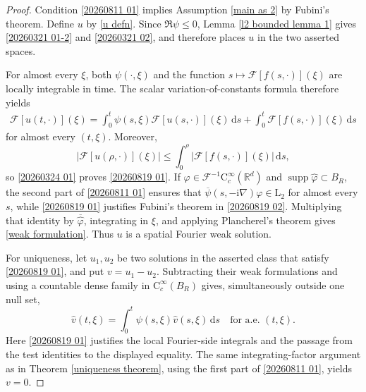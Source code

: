 \documentclass[11pt,reqno]{amsart}
\theoremstyle{definition}
\theoremstyle{remark}
\newcommand\bR{\mathbb{R}}
\newcommand\cF{\mathcal{F}}
\numberwithin{equation}{section}
\begin{document}
\begin{proof}
Condition \eqref{20260811 01} implies Assumption \ref{main as 2} by
Fubini's theorem.  Define $u$ by \eqref{u defn}.  Since
$\Re\psi\leq0$, Lemma \ref{l2 bounded lemma 1} gives
\eqref{20260321 01-2} and \eqref{20260321 02}, and therefore places $u$ in
the two asserted spaces.

For almost every $\xi$, both $\psi(\cdot,\xi)$ and the function
$s\mapsto\cF[f(s,\cdot)](\xi)$ are locally integrable in time.  The scalar
variation-of-constants formula therefore yields
\begin{align}
										\label{20260819 02}
\cF[u(t,\cdot)](\xi)
=\int_0^t\psi(s,\xi)\cF[u(s,\cdot)](\xi)\,\mathrm{d}s
+\int_0^t\cF[f(s,\cdot)](\xi)\,\mathrm{d}s
\end{align}
for almost every $(t,\xi)$.  Moreover,
\[
|\cF[u(\rho,\cdot)](\xi)|
\leq\int_0^\rho|\cF[f(s,\cdot)](\xi)|\,\mathrm{d}s,
\]
so \eqref{20260324 01} proves \eqref{20260819 01}.  If
$\varphi\in\cF^{-1}\mathrm C_c^\infty(\bR^d)$ and
$\operatorname{supp}\widehat\varphi\subset B_R$, the second part of
\eqref{20260811 01} ensures that
$\overline\psi(s,-\mathrm i\nabla)\varphi\in\mathrm L_2$ for almost every
$s$, while \eqref{20260819 01} justifies Fubini's theorem in
\eqref{20260819 02}.  Multiplying that identity by
$\overline{\widehat\varphi}$, integrating in $\xi$, and applying
Plancherel's theorem gives \eqref{weak formulation}.  Thus $u$ is a spatial
Fourier weak solution.

For uniqueness, let $u_1,u_2$ be two solutions in the asserted class that
satisfy \eqref{20260819 01}, and put $v=u_1-u_2$.  Subtracting their weak
formulations and using a countable dense family in
$\mathrm C_c^\infty(B_R)$ gives, simultaneously outside one null set,
\[
\widehat v(t,\xi)=\int_0^t\psi(s,\xi)\widehat v(s,\xi)\,\mathrm{d}s
\quad\text{for a.e. }(t,\xi).
\]
Here \eqref{20260819 01} justifies the local Fourier-side integrals and the
passage from the test identities to the displayed equality.  The same
integrating-factor argument as in Theorem \ref{uniqueness theorem}, using
the first part of \eqref{20260811 01}, yields $v=0$.
\end{proof}
\end{document}
